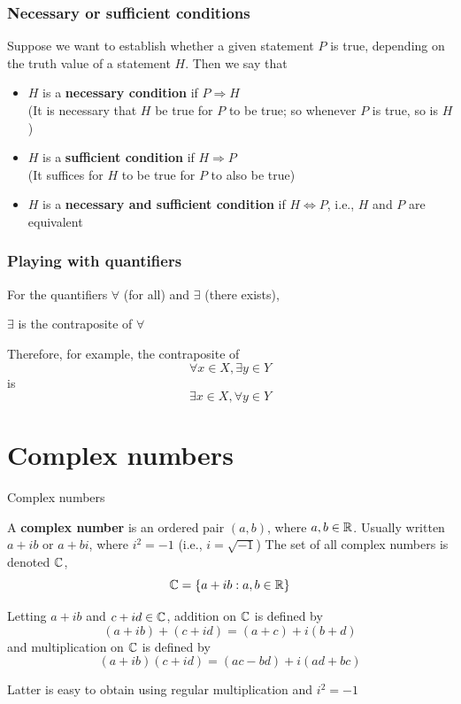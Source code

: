 \documentclass[aspectratio=169]{beamer}\usepackage[]{graphicx}\usepackage[]{xcolor}
\begin{document}
\begin{frame}
\frametitle{Necessary or sufficient conditions}
	Suppose we want to establish whether a given statement $P$ is true, depending
	on the truth value of a statement $H$. Then we say that
	\begin{itemize}
		\item $H$ is a \textbf{necessary condition} if $P\Rightarrow H$ \\
		(It is necessary that $H$ be true for $P$ to be true; so whenever
		$P$ is true, so is $H$)
		\vfill
		\item $H$ is a \textbf{sufficient condition} if $H\Rightarrow P$ \\
		(It suffices for $H$ to be true for $P$ to also be true)
		\vfill
		\item $H$ is a \textbf{necessary and sufficient condition} if $H\Leftrightarrow
		P$, i.e., $H$ and $P$ are equivalent
	\end{itemize}
\end{frame}

\begin{frame}
\frametitle{Playing with quantifiers}
	For the quantifiers $\forall$ (for all) and $\exists$ (there exists),
	\begin{center}
		$\exists$ is the contraposite of $\forall$
	\end{center}
	\vfill
	Therefore, for example, the contraposite of
	\[
	\forall x\in X,\exists y\in Y
	\]
	is
	\[
	\exists x\in X,\forall y\in Y
	\]
\end{frame}

\section{Complex numbers}

\begin{frame}{Complex numbers}
	\begin{definition}
		A \textbf{complex number} is an ordered pair $(a,b)$, where $a,b\in\mathbb{R}$. Usually written $a+ib$ or $a+bi$, where $i^2=-1$ (i.e., $i=\sqrt{-1}$)
		\vfill
		The set of all complex numbers is denoted $\mathbb{C}$, 
		\[
		\mathbb{C}=\{a+ib: a,b\in\mathbb{R}\}
		\]
	\end{definition}
\end{frame}

\begin{frame}
	\begin{definition}
		Letting $a+ib$ and $c+id\in\mathbb{C}$, addition on $\mathbb{C}$ is defined by
		\[
		(a+ib)+(c+id) = (a+c)+i(b+d)
		\]
		and multiplication on $\mathbb{C}$ is defined by
		\[
		(a+ib)(c+id) = (ac-bd)+i(ad+bc)
		\]
	\end{definition}
	\vfill
	Latter is easy to obtain using regular multiplication and $i^2=-1$
\end{frame}
\end{document}
